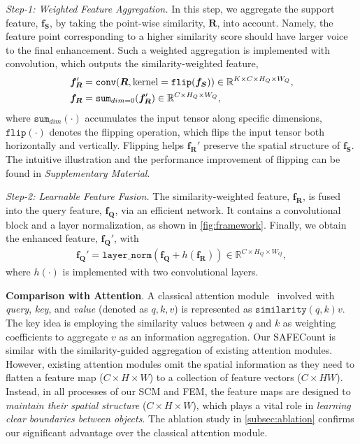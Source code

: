 \documentclass[10pt,twocolumn,letterpaper]{article}
\newcommand{\method}{SAFECount\xspace}
\newcommand{\supp}{\textit{Supplementary Material}\xspace}
\newcommand{\fs}{\bm{f_S}}
\newcommand{\fq}{\bm{f_Q}}
\newcommand{\Rnorm}{\bm{R}}
\newcommand{\fweight}{\bm{f_R}}
\begin{document}
\textit{Step-1: Weighted Feature Aggregation.}
In this step, we aggregate the support feature, $\fs$, by taking the point-wise similarity, $\Rnorm$, into account. 
Namely, the feature point corresponding to a higher similarity score should have larger voice to the final enhancement.
Such a weighted aggregation is implemented with convolution, which outputs the similarity-weighted feature,
\begin{align}
  \fweight' & = \mathtt{conv}(\bm{R}, {\rm kernel} = \mathtt{flip}(\bm{f_S})) \in \mathbb{R}^{K \times C \times H_Q \times W_Q}, \\
  \fweight & = \mathtt{sum}_{dim=0}(\fweight') \in \mathbb{R}^{C \times H_Q \times W_Q},  \label{equ:f_R}
\end{align}
where $\mathtt{sum}_{dim}(\cdot)$ accumulates the input tensor along specific dimensions, 
$\mathtt{flip}(\cdot)$ denotes the flipping operation, which flips the input tensor both horizontally and vertically.
Flipping helps $\fweight'$ preserve the spatial structure of $\fs$.
The intuitive illustration and the performance improvement of flipping can be found in \supp.


\textit{Step-2: Learnable Feature Fusion.}
The similarity-weighted feature, $\fweight$, is fused into the query feature, $\fq$, via an efficient network.
It contains a convolutional block and a layer normalization, as shown in \cref{fig:framework}.
Finally, we obtain the enhanced feature, $\fq'$, with
\begin{align}
  \fq' = \mathtt{layer\_norm}(\fq + h(\fweight)) \in \mathbb{R}^{C \times H_Q \times W_Q},  \label{equ:fuse}
\end{align}
where $h(\cdot)$ is implemented with two convolutional layers. 



\vspace{2pt} \noindent \textbf{Comparison with Attention}. A classical attention module~\cite{attention_need} involved with \textit{query}, \textit{key}, and \textit{value} (denoted as $q,k,v$) is represented as $\mathtt{similarity}(q, k) v$. 
The key idea is employing the similarity values between $q$ and $k$ as weighting coefficients to aggregate $v$ as an information aggregation. Our \method is similar with the similarity-guided aggregation of existing attention modules. 
However, existing attention modules omit the spatial information as they need to flatten a feature map ($C \times H \times W$) to a collection of feature vectors ($C \times H W$). Instead, in all processes of our SCM and FEM, the feature maps are designed to \textit{maintain their spatial structure} ($C \times H \times W$), which plays a vital role in \textit{learning clear boundaries between objects}. 
The ablation study in \cref{subsec:ablation} confirms our significant advantage over the classical attention module. 
\end{document}
